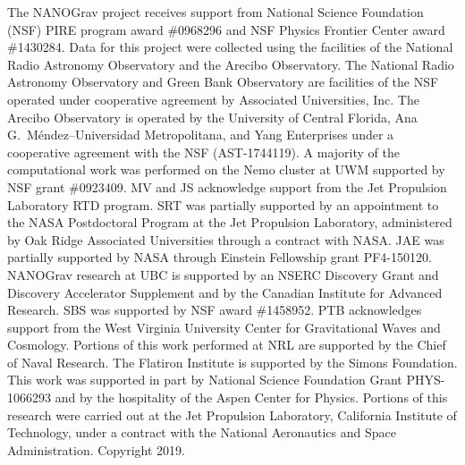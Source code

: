 \documentclass[reprint,
 amsmath,amssymb,
 aps,prd,floatfix,
]{revtex4-1}
\begin{document}
\acknowledgments
The NANOGrav project receives support from National Science Foundation (NSF) PIRE program award \#0968296 and NSF Physics Frontier Center award \#1430284.
Data for this project were collected using the facilities of the National Radio Astronomy Observatory and the Arecibo Observatory. The National Radio Astronomy Observatory and Green Bank Observatory are facilities of the NSF operated under cooperative agreement by Associated Universities, Inc. The Arecibo Observatory is operated by the University of Central Florida, Ana G.\ M\'endez--Universidad Metropolitana, and Yang Enterprises under a cooperative agreement with the NSF (AST-1744119).
A majority of the computational work was performed on the Nemo cluster at UWM supported by NSF grant \#0923409.
MV and JS acknowledge support from the Jet Propulsion Laboratory RTD program.
SRT was partially supported by an appointment to the NASA Postdoctoral Program at the Jet Propulsion Laboratory, administered by Oak Ridge Associated Universities through a contract with NASA.
JAE was partially supported by NASA through Einstein Fellowship grant PF4-150120.
NANOGrav research at UBC is supported by an NSERC Discovery Grant and Discovery Accelerator Supplement and by the Canadian Institute for Advanced Research.
SBS was supported by NSF award \#1458952.
PTB acknowledges support from the West Virginia University Center for Gravitational Waves and Cosmology.
Portions of this work performed at NRL are supported by the Chief of Naval Research.
The Flatiron Institute is supported by the Simons Foundation.
This work was supported in part by National Science Foundation Grant PHYS-1066293 and by the hospitality of the Aspen Center for Physics.
Portions of this research were carried out at the Jet Propulsion Laboratory, California Institute of Technology, under a contract with the National Aeronautics and Space Administration. Copyright 2019.


\end{document}
